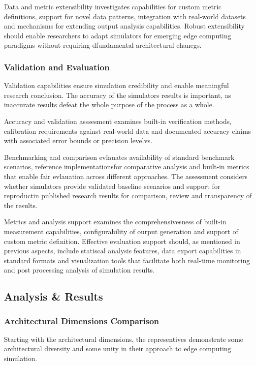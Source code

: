 Data and metric extensibility investigates capabilities for custom metric definitions, support for novel data patterns, integration with real-world datasets and mechanisms for extending output analysis capabilities.
Robust extensibility should enable researchers to adapt simulators for emerging edge computing paradigms without requiring dfundamental architectural chanegs.

\subsubsection{Validation and Evaluation}
Validation capabilities ensure simulation credibility and enable meaningful research conclusion.
The accuracy of the simulators results is important, as inaccurate results defeat the whole purpose of the process as a whole.

Accuracy and validation asssesment examines built-in verification methods, calibration requirements against real-world data and documented accuracy claims with associated error bounds or precision levelvs.

Benchmarking and comparison evlauates availability of standard benchmark scenarios, reference implementationsfor comparative analysis and built-in metrics that enable fair evlauation across different approaches.
The assessment considers whether simulators provide validated baseline scenarios and support for reproductin published research results for comparison, review and transparency of the results.

Metrics and analysis support examines the comprehensivesness of built-in measurement capabilities, configurability of ourput generation and support of custom metric definition.
Effective evaluation support should, as mentioned in previous aspects, include statiscal analysis features, data export capabilities in standard formats and visualization tools that facilitate both real-time monitoring and post processing analysis of simulation results. 

\subsection{Analysis \& Results}

\subsubsection{Architectural Dimensions Comparison}
Starting with the architectural dimensions, the representives demonstrate some architectural diversity and some unity in their approach to edge computing simulation.


